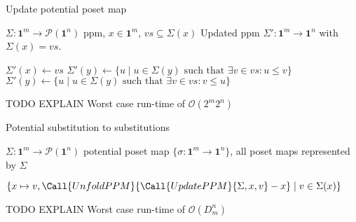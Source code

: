 \documentclass{llncs}
\newcommand{\pint}[1]{\mathbf{1}^{#1}}
\newcommand{\pow}[1]{\mathcal{P}({#1})}
\begin{document}






\appendix

\begin{algorithm}[H]
  \caption{Update potential poset map}\label{alg:updateppm}
  \begin{algorithmic}
    \Require $\Sigma : \pint{m} \to \pow{\pint{n}}$ ppm, $x \in
    \pint{m}$, $vs \subseteq \Sigma(x)$ %
    \Ensure Updated ppm $\Sigma' : \pint{m} \to \pint{n}$ with $\Sigma(x) = vs$.

    \For{$y \gets \pint{m}$}
    \State $\Sigma'(x) \gets vs$
    \State $\Sigma'(y) \gets \{ u \mid u \in \Sigma(y) \text{ such that } \exists
    v \in vs : u \leq v \} $
    \State $\Sigma'(y) \gets \{ u \mid u \in \Sigma(y) \text{ such that } \exists
    v \in vs : v \leq u \} $
    \EndIf
    \EndFor
    \State {}
    \EndProcedure
  \end{algorithmic}
\end{algorithm}

TODO EXPLAIN
Worst case run-time of $\mathcal{O}(2^m 2^n)$


\begin{algorithm}[H]
  \caption{Potential substitution to substitutions}\label{alg:getsubsts}
  \begin{algorithmic}
    \Require $\Sigma : \pint{m} \to \pow{\pint{n}}$ potential poset map
    \Ensure $\{ \sigma : \pint{m} \to \pint{n} \}$, all poset maps represented
    by $\Sigma$

    \State \Return $\{ x \mapsto v, \Call{UnfoldPPM}{\Call{UpdatePPM}{\Sigma,x,v} - x} \mid v \in \Sigma(x) \}$
    \EndProcedure
  \end{algorithmic}
\end{algorithm}



TODO EXPLAIN
Worst case run-time of $\mathcal{O}(D_m^n)$
\end{document}
